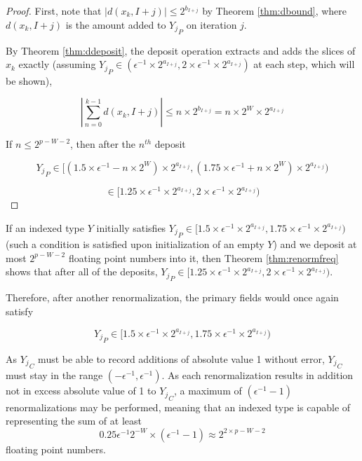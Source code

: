 \documentclass[12pt]{article}
\theoremstyle{definition}
\numberwithin{equation}{section}
\numberwithin{figure}{section}
\begin{document}
    \begin{proof}
    First, note that $|d(x_k, I + j)| \leq 2^{b_{I + j}}$ by Theorem \ref{thm:dbound}, where $d(x_k, I + j)$ is the amount added to ${Y_j}_P$ on iteration $j$.

    By Theorem \ref{thm:ddeposit}, the deposit operation extracts and adds the slices of $x_k$ exactly (assuming ${Y_j}_P \in (\epsilon^{-1}\times 2^{a_{I + j}}, 2 \times \epsilon^{-1}\times 2^{a_{I + j}})$ at each step, which will be shown),

    \begin{equation*}
    |\sum \limits_{n = 0}^{k - 1} d(x_k, I + j)| \leq n \times 2^{b_{I + j}} = n \times 2^{W} \times 2^{a_{I + j}}
    \end{equation*}

    If $n \leq 2^{p - W - 2}$, then after the $n^{th}$ deposit

    \begin{equation*}
    {Y_j}_P \in [(1.5 \times \epsilon^{-1} - n \times 2^W)\times 2^{a_{I + j}}, (1.75 \times \epsilon^{-1} + n \times 2^W)\times 2^{a_{I + j}})
    \end{equation*}

    \begin{equation*}
    \in [1.25 \times \epsilon^{-1}\times 2^{a_{I + j}}, 2 \times \epsilon^{-1}\times 2^{a_{I + j}})
    \end{equation*}
    \end{proof}

    If an indexed type $Y$ initially satisfies ${Y_j}_P \in [1.5 \times \epsilon^{-1}\times 2^{a_{I + j}}, 1.75 \times \epsilon^{-1}\times 2^{a_{I + j}})$ (such a condition is satisfied upon initialization of an empty $Y$) and we deposit at most $2^{p - W - 2}$ floating point numbers into it, then Theorem \ref{thm:renormfreq} shows that after all of the deposits, ${Y_j}_P \in [1.25 \times \epsilon^{-1}\times 2^{a_{I + j}}, 2 \times \epsilon^{-1}\times 2^{a_{I + j}})$.

    Therefore, after another renormalization, the primary fields would once again satisfy

    \begin{equation*}
    {Y_j}_P \in [1.5 \times \epsilon^{-1}\times 2^{a_{I + j}}, 1.75 \times \epsilon^{-1}\times 2^{a_{I + j}})
    \end{equation*}

    As ${Y_j}_C$ must be able to record additions of absolute value 1 without error, ${Y_j}_C$ must stay in the range $(-\epsilon^{-1}, \epsilon^{-1})$. As each renormalization results in addition not in excess absolute value of 1 to ${Y_j}_C$, a maximum of $(\epsilon^{-1} - 1)$ renormalizations may be performed, meaning that an indexed type is capable of representing the sum of at least
    \begin{equation}
      0.25\epsilon^{-1}2^{-W} \times (\epsilon^{-1} - 1) \approx 2^{2 \times p - W - 2}
      \label{eq:totalfreq}
    \end{equation}
    floating point numbers.
\end{document}

